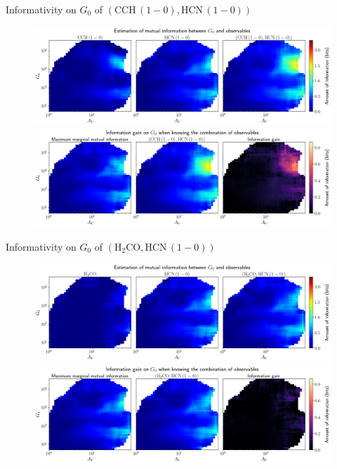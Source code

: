 \documentclass{beamer}
\begin{document}
\begin{frame}{Informativity on $G_0$ of $\left(\mathrm{CCH\,(1-0)},\mathrm{HCN\,(1-0)}\right)$}
    \begin{figure}
        \centering
        \includegraphics[width=0.95\linewidth]{../mi/g0__cch10_hcn10_mi.png}
        \vfill
        \includegraphics[width=0.95\linewidth]{../mi/g0__cch10_hcn10_mi_gain.png}
    \end{figure}
\end{frame}

\begin{frame}{Informativity on $G_0$ of $\left(\mathrm{H_2CO},\mathrm{HCN\,(1-0)}\right)$}
    \begin{figure}
        \centering
        \includegraphics[width=0.95\linewidth]{../mi/g0__h2co_hcn10_mi.png}
        \vfill
        \includegraphics[width=0.95\linewidth]{../mi/g0__h2co_hcn10_mi_gain.png}
    \end{figure}
\end{frame}
\end{document}
